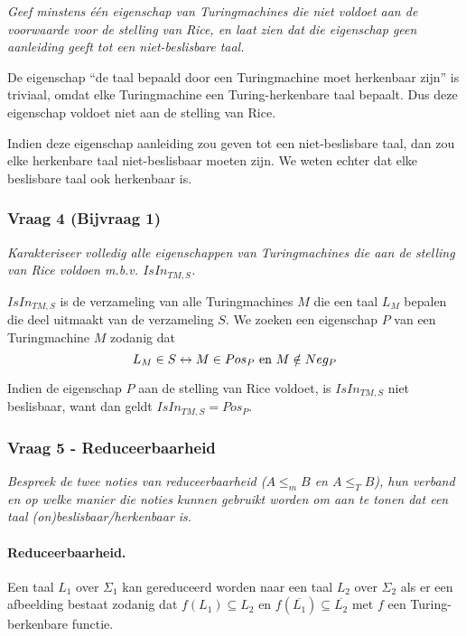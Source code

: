 \textit{Geef minstens één eigenschap van Turingmachines die niet voldoet aan de voorwaarde voor de stelling van Rice, en laat zien dat die eigenschap geen aanleiding geeft tot een niet-beslisbare taal.}

De eigenschap ``de taal bepaald door een Turingmachine moet herkenbaar zijn'' is triviaal, omdat elke Turingmachine een Turing-herkenbare taal bepaalt. Dus deze eigenschap voldoet niet aan de stelling van Rice.

Indien deze eigenschap aanleiding zou geven tot een niet-beslisbare taal, dan zou elke herkenbare taal niet-beslisbaar moeten zijn. We weten echter dat elke beslisbare taal ook herkenbaar is.

\subsubsection{Vraag 4 (Bijvraag 1)}

\textit{Karakteriseer volledig alle eigenschappen van Turingmachines die aan de stelling van Rice voldoen m.b.v. $IsIn_{TM,S}$.}

$IsIn_{TM,S}$ is de verzameling van alle Turingmachines $M$ die een taal $L_M$ bepalen die deel uitmaakt van de verzameling $S$. We zoeken een eigenschap $P$ van een Turingmachine $M$ zodanig dat
\begin{equation*}
  L_M \in S \leftrightarrow M \in Pos_P \text{ en } M \notin Neg_P
\end{equation*} 

Indien de eigenschap $P$ aan de stelling van Rice voldoet, is $IsIn_{TM,S}$ niet beslisbaar, want dan geldt $IsIn_{TM,S} = Pos_P$.

\subsubsection{Vraag 5 - Reduceerbaarheid}

\textit{Bespreek de twee noties van reduceerbaarheid ($A \leq_m B$ en $A \leq_T B$), hun verband en op welke manier die noties kunnen gebruikt worden om aan te tonen dat een taal (on)beslisbaar/herkenbaar is.}

\paragraph{Reduceerbaarheid.} Een taal $L_1$ over $\Sigma_1$ kan gereduceerd worden naar een taal $L_2$ over $\Sigma_2$ als er een afbeelding  bestaat zodanig dat $f(L_1) \subseteq L_2$ en $f(\overline{L_1}) \subseteq \overline{L_2}$ met $f$ een Turing-berkenbare functie.


